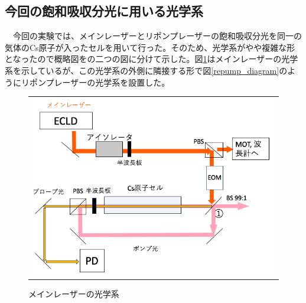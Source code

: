 \documentclass[uplatex, dvipdfmx, a4paper, report, papersize, 11pt]{jsbook}
\begin{document}
\subsection{今回の飽和吸収分光に用いる光学系}
　今回の実験では、メインレーザーとリポンプレーザーの飽和吸収分光を同一の気体のCs原子が入ったセルを用いて行った。そのため、光学系がやや複雑な形となったので概略図をの二つの図に分けて示した。図\ref{Main_Laser_diagram}はメインレーザーの光学系を示しているが、この光学系の外側に隣接する形で図\ref{repump_diagram}のようにリポンプレーザーの光学系を設置した。
\begin{figure}[htpb]
  \centering
    \begin{tabular}{c}
      \begin{minipage}{1\hsize}
        \centering
          \includegraphics[keepaspectratio,  scale=0.35,  angle=0]
                          {figures/saturated-absorption/Main_Laser_diagram.png}
                          \caption{メインレーザーの光学系}
                          \label{Main_Laser_diagram}
      \end{minipage}\\


\end{tabular}
\end{figure}
\end{document}
